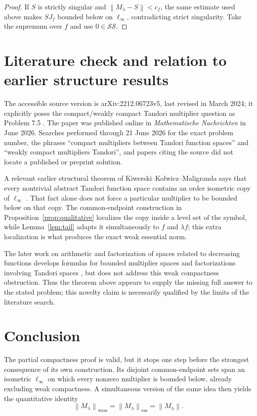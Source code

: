\documentclass[11pt]{article}
\theoremstyle{remark}
\newcommand{\StrictSing}{\mathcal{SS}}
\newcommand{\norm}[1]{\left\lVert #1\right\rVert}
\begin{document}
\begin{proof}
If $S$ is strictly singular and $\norm{M_\lambda-S}<c_f$, the same estimate
used above makes $SJ_f$ bounded below on $\ell_\infty$, contradicting strict
singularity.  Take the supremum over $f$ and use $0\in\StrictSing$.
\end{proof}

\section{Literature check and relation to earlier structure results}

The accessible source version is arXiv:2212.06723v5, last revised in March
2024; it explicitly poses the compact/weakly compact Tandori multiplier
question as Problem 7.5 \cite{KT}.  The paper was published online in
\emph{Mathematische Nachrichten} in June 2026.  Searches performed through
21 June 2026 for the exact problem number, the phrases ``compact multipliers
between Tandori function spaces'' and ``weakly compact multipliers Tandori'',
and papers citing the source did not locate a published or preprint solution.

A relevant earlier structural theorem of Kiwerski--Kolwicz--Maligranda says
that every nontrivial abstract Tandori function space contains an order
isometric copy of $\ell_\infty$ \cite[Proposition 4.8]{KKM}.  That fact alone
does not force a particular multiplier to be bounded below on that copy.  The
common-endpoint construction in Proposition~\ref{prop:qualitative} localizes
the copy inside a level set of the symbol, while Lemma~\ref{lem:tail} adapts
it simultaneously to $f$ and $\lambda f$; this extra localization is what
produces the exact weak essential norm.

The later work on arithmetic and factorization of spaces related to
decreasing functions develops formulas for bounded multiplier spaces and
factorizations involving Tandori spaces \cite{KTamalgams}, but does not
address this weak compactness obstruction.  Thus the theorem above appears
to supply the missing full answer to the stated problem; this novelty claim
is necessarily qualified by the limits of the literature search.

\section{Conclusion}

The partial compactness proof is valid, but it stops one step before the
strongest consequence of its own construction.  Its disjoint common-endpoint
sets span an isometric $\ell_\infty$ on which every nonzero multiplier is
bounded below, already excluding weak compactness.  A simultaneous
version of the same idea then yields the quantitative identity
\[
 \boxed{\quad
 \norm{M_\lambda}_{\mathrm{wess}}
 =\norm{M_\lambda}_{\mathrm{ess}}
 =\norm{M_\lambda}.
 \quad}
\]
\end{document}
